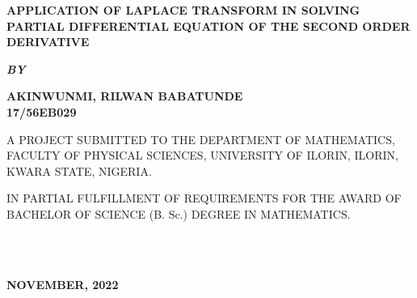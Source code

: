 \documentclass[11pt]{report}
\newcommand{\bt}[1]{\textbf{#1}}
\begin{document}
	\clearpage
	\thispagestyle{empty}
	\begin{center}
		\Large \bt{APPLICATION OF LAPLACE TRANSFORM IN SOLVING PARTIAL DIFFERENTIAL EQUATION OF THE SECOND ORDER DERIVATIVE}
	\end{center}
	
	\hspace{7cm}
	
	\begin{center}
		\textbf{\textit{BY}}
	\end{center}
	
	\hspace{5cm}
	
	\begin{center}
		\large \textbf{AKINWUNMI, RILWAN BABATUNDE 
			\\
			17/56EB029}
	\end{center}
	
	\hspace{9cm}
	
	\begin{center}
		A PROJECT SUBMITTED TO THE DEPARTMENT OF MATHEMATICS, FACULTY OF PHYSICAL SCIENCES, UNIVERSITY OF ILORIN, ILORIN, KWARA STATE, NIGERIA.
	\end{center}
	
	\hspace{7cm}
	
	\begin{center}
		IN PARTIAL FULFILLMENT OF REQUIREMENTS FOR THE AWARD OF BACHELOR OF SCIENCE (B. Sc.) DEGREE IN MATHEMATICS.
	\end{center}
	\hspace{5cm}
	\\ \\ 
	\begin{center}
		\textbf{NOVEMBER, 2022}
	\end{center}
	
	\newpage
\end{document}
